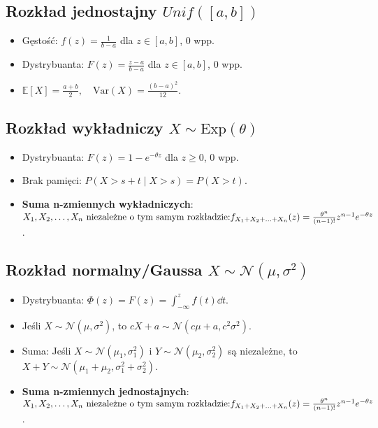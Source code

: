 \documentclass{article}
\theoremstyle{definition}
\theoremstyle{remark}
\begin{document}
\begin{multicols}{2}
    \subsection*{Rozkład jednostajny \(Unif([a, b]) \)}
    \begin{itemize}[itemsep=0pt, left=0pt]
        \item Gęstość: \( f(z) = \frac{1}{b-a} \) dla \( z \in [a, b] \), 0 wpp.
        \item Dystrybuanta: \( F(z) = \frac{z-a}{b-a} \) dla \( z \in [a, b] \), 0 wpp.
        \item \(\mathbb{E}[X] = \frac{a+b}{2}, \quad \text{Var}(X) = \frac{(b-a)^2}{12}\).
    \end{itemize}

    \subsection*{Rozkład wykładniczy \( X \sim \text{Exp}(\theta) \)}
    \begin{itemize}[itemsep=0pt, left=0pt]
        \item Dystrybuanta: \( F(z) = 1 - e^{-\theta z} \) dla \( z \geq 0 \), 0 wpp.
        \item Brak pamięci: \( P(X > s+t \mid X > s) = P(X > t) \). 
          
        \item \textbf{Suma n-zmiennych wykładniczych}: \(X_1, X_2, \ldots, X_n \\
        \text{ niezależne o tym samym rozkładzie:} \\
         f_{X_1 + X_2 + \ldots + X_n}(z) =  \frac{\theta^n}{(n-1)!}z^{n-1}e^{-\theta z}\).
    \end{itemize}

    \subsection*{Rozkład normalny/Gaussa \( X \sim \mathcal{N}(\mu, \sigma^2) \)}
    \begin{itemize}[itemsep=0pt, left=0pt]
        \item Dystrybuanta: \(\Phi(z)=F(z) = \int_{-\infty}^{z} f(t) \dd{t}\).
        \item Jeśli \(X \sim \mathcal{N}(\mu, \sigma^2)\), to \(cX+a \sim \mathcal{N}(c\mu+a, c^2\sigma^2)\).
        \item Suma: Jeśli \( X \sim \mathcal{N}(\mu_1, \sigma_1^2) \) i \( Y \sim \mathcal{N}(\mu_2, \sigma_2^2) \) są niezależne, to \( X+Y \sim \mathcal{N}(\mu_1+\mu_2, \sigma_1^2+\sigma_2^2) \).
        \item \textbf{Suma n-zmiennych jednostajnych}: \(X_1, X_2, \ldots, X_n \\
        \text{ niezależne o tym samym rozkładzie:} \\
         f_{X_1 + X_2 + \ldots + X_n}(z) =  \frac{\theta^n}{(n-1)!}z^{n-1}e^{-\theta z}\).
    \end{itemize}


\end{multicols}
\end{document}
